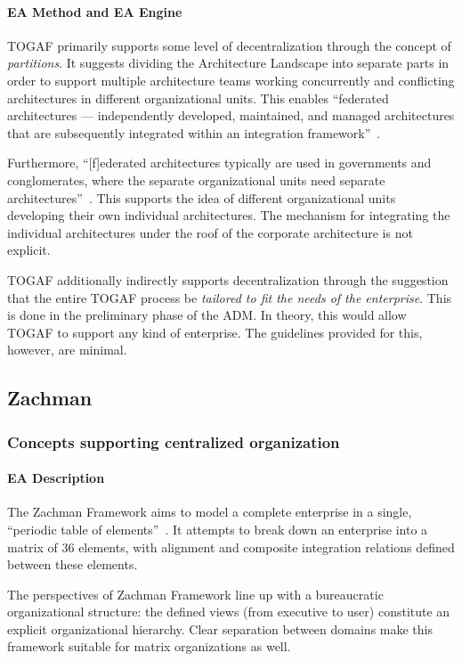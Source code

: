 \paragraph*{EA Method and EA Engine}
TOGAF primarily supports some level of decentralization through the concept of \textit{partitions}. It suggests dividing the Architecture Landscape into separate parts in order to support multiple architecture teams working concurrently and conflicting architectures in different organizational units. This enables ``federated architectures — independently developed, maintained, and managed architectures that are subsequently integrated within an integration framework''~\cite[Ch. 40.3]{togaf9.1}. 

Furthermore, ``[f]ederated architectures typically are used in governments and conglomerates, where the separate organizational units need separate architectures''~\cite[Ch. 40.3]{togaf9.1}. This supports the idea of different organizational units developing their own individual architectures. The mechanism for integrating the individual architectures under the roof of the corporate architecture is not explicit. 


TOGAF additionally indirectly supports decentralization through the suggestion that the entire TOGAF process be\textit{ tailored to fit the needs of the enterprise}. This is done in the preliminary phase of the ADM. In theory, this would allow TOGAF to support any kind of enterprise. The guidelines provided for this, however, are minimal. 

\subsection{Zachman}
\subsubsection{Concepts supporting centralized organization}

\paragraph*{EA Description}
The Zachman Framework aims to model a complete enterprise in a single, ``periodic table of elements''~\cite{Bente2012}. It attempts to break down an enterprise into a matrix of 36 elements, with alignment and composite integration relations defined between these elements. 

The perspectives of Zachman Framework line up with a bureaucratic organizational structure: the defined views (from executive to user) constitute an explicit organizational hierarchy. Clear separation between domains make this framework suitable for matrix organizations as well. 


